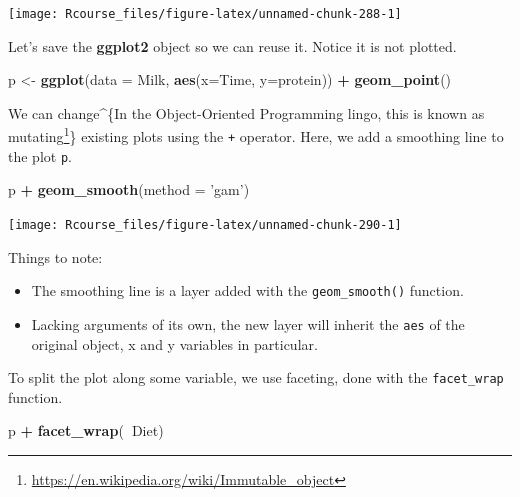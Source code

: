 \documentclass[]{book}
\newenvironment{Shaded}{\begin{snugshade}}{\end{snugshade}}
\newcommand{\DataTypeTok}[1]{\textcolor[rgb]{0.13,0.29,0.53}{#1}}
\newcommand{\KeywordTok}[1]{\textcolor[rgb]{0.13,0.29,0.53}{\textbf{#1}}}
\newcommand{\NormalTok}[1]{#1}
\newcommand{\OperatorTok}[1]{\textcolor[rgb]{0.81,0.36,0.00}{\textbf{#1}}}
\newcommand{\StringTok}[1]{\textcolor[rgb]{0.31,0.60,0.02}{#1}}
\providecommand{\tightlist}{%
  \setlength{\itemsep}{0pt}\setlength{\parskip}{0pt}}
\renewcommand{\href}[2]{#2\footnote{\url{#1}}}
\theoremstyle{definition}
\theoremstyle{definition}
\theoremstyle{definition}
\theoremstyle{remark}
\begin{document}
\texttt{[image: Rcourse\_files/figure-latex/unnamed-chunk-288-1]}

Let's save the \textbf{ggplot2} object so we can reuse it.
Notice it is not plotted.

\begin{Shaded}
\begin{Highlighting}[]
\NormalTok{p <-}\StringTok{ }\KeywordTok{ggplot}\NormalTok{(}\DataTypeTok{data =}\NormalTok{ Milk, }\KeywordTok{aes}\NormalTok{(}\DataTypeTok{x=}\NormalTok{Time, }\DataTypeTok{y=}\NormalTok{protein)) }\OperatorTok{+}
\StringTok{  }\KeywordTok{geom_point}\NormalTok{()}
\end{Highlighting}
\end{Shaded}

We can change\^{}\{In the Object-Oriented Programming lingo, this is known as \href{https://en.wikipedia.org/wiki/Immutable_object}{mutating}\} existing plots using the \texttt{+} operator.
Here, we add a smoothing line to the plot \texttt{p}.

\begin{Shaded}
\begin{Highlighting}[]
\NormalTok{p }\OperatorTok{+}\StringTok{ }\KeywordTok{geom_smooth}\NormalTok{(}\DataTypeTok{method =} \StringTok{'gam'}\NormalTok{)}
\end{Highlighting}
\end{Shaded}

\texttt{[image: Rcourse\_files/figure-latex/unnamed-chunk-290-1]}

Things to note:

\begin{itemize}
\tightlist
\item
  The smoothing line is a layer added with the \texttt{geom\_smooth()} function.
\item
  Lacking arguments of its own, the new layer will inherit the \texttt{aes} of the original object, x and y variables in particular.
\end{itemize}

To split the plot along some variable, we use faceting, done with the \texttt{facet\_wrap} function.

\begin{Shaded}
\begin{Highlighting}[]
\NormalTok{p }\OperatorTok{+}\StringTok{ }\KeywordTok{facet_wrap}\NormalTok{(}\OperatorTok{~}\NormalTok{Diet)}
\end{Highlighting}
\end{Shaded}
\end{document}

